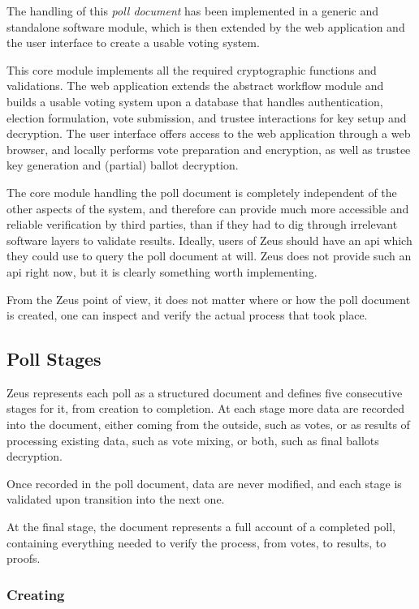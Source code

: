 \documentclass[jets]{usenixjournal}
\begin{document}
The handling of this \emph{poll document} has been implemented in a
generic and standalone software module, which is then extended by the
web application and the user interface to create a usable voting system.

This core module implements all the required cryptographic functions and
validations. The web application extends the abstract workflow module
and builds a usable voting system upon a database
that handles authentication, election formulation, vote submission,
and trustee interactions for key setup and decryption.
The user interface offers access to the web application through
a web browser, and locally performs vote preparation and encryption,
as well as trustee key generation and (partial) ballot decryption.

The core module handling the poll document is completely independent of
the other aspects of the system, and therefore can provide much more
accessible and reliable verification by third parties, than if they
had to dig through irrelevant software layers to validate results.
Ideally, users of Zeus should have an {\sc api} which they could use
to query the poll document at will. Zeus does not provide such an {\sc
  api} right now, but it is clearly something worth implementing.

From the Zeus point of view, it does not matter where or how the poll
document is created, one can inspect and verify the actual process
that took place.

\subsection{Poll Stages}
Zeus represents each poll as a structured document
and defines five consecutive stages for it, from creation to completion.
At each stage more data are recorded into the document,
either coming from the outside, such as votes,
or as results of processing existing data, such as vote mixing,
or both, such as final ballots decryption.

Once recorded in the poll document, data are never modified,
and each stage is validated upon transition into the next one.

At the final stage,
the document represents a full account of a completed poll,
containing everything needed to verify the process,
from votes, to results, to proofs.

\subsubsection{Creating}
\label{sec:creating}
\end{document}
